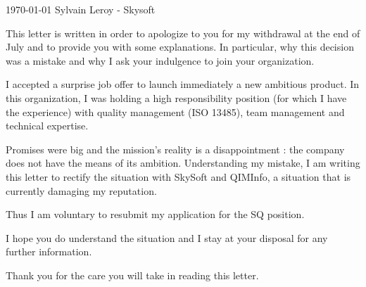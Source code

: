 \documentclass[12pt, a4paper]{awesome-cv}
\begin{document}
\makecvheader{}

\makecvfooter
  {\today}
  {Sylvain Leroy - Skysoft}
  {}

\makelettertitle

\begin{cvletter}
  This letter is written in order to apologize to you for my withdrawal at the end of July and to provide you with some explanations. In particular, why this decision was a mistake and why I ask your indulgence to join your organization.

  I accepted a surprise job offer to launch immediately a new ambitious product. In this organization, I was holding a high responsibility position (for which I have the experience) with quality management (ISO 13485), team management and technical expertise.

  Promises were big and the mission's reality is a disappointment : the company does not have the means of its ambition. Understanding my mistake, I am writing this letter to rectify the situation with SkySoft and QIMInfo, a situation that is currently damaging my reputation. 
  
  Thus I am voluntary to resubmit my application for the SQ position.
  
  I hope you do understand the situation and I stay at your disposal for any further information.
  
  Thank you for the care you will take in reading this letter.

\end{cvletter}


\makeletterclosing
\end{document}
